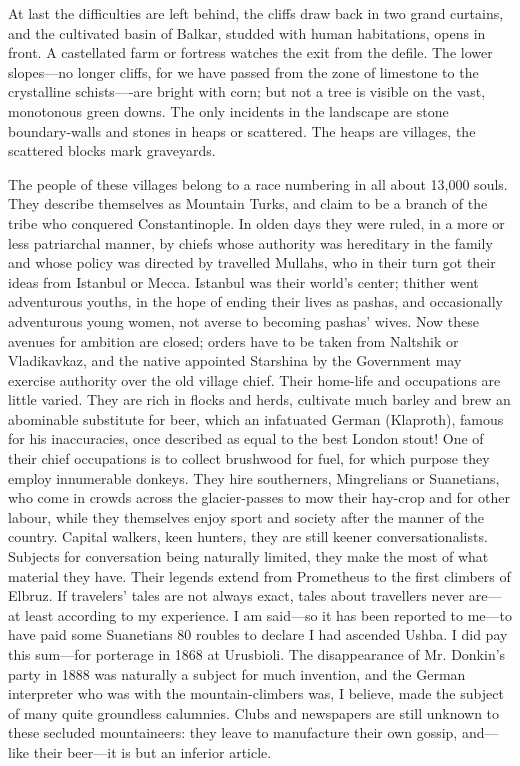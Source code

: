 \documentclass[25pt, a4paper]{article}
\begin{document}
	At last the difficulties are left behind, the cliffs draw back in two grand curtains, and the cultivated basin of Balkar, studded with human habitations, opens in front. A castellated farm or fortress watches the exit from the defile. The lower slopes—no longer cliffs, for we have passed from the zone of limestone to the crystalline schists—-are bright with corn; but not a tree is visible on the vast, monotonous green downs. The only incidents in the landscape are stone boundary-walls and stones in heaps or scattered. The heaps are villages, the scattered blocks mark graveyards.
	
	The people of these villages belong to a race numbering in all about 13,000 souls. They describe themselves as Mountain Turks, and claim to be a branch of the tribe who conquered Constantinople. In olden days they were ruled, in a more or less patriarchal manner, by chiefs whose authority was hereditary in the family and whose policy was directed by travelled Mullahs, who in their turn got their ideas from Istanbul or Mecca. Istanbul was their world's center; thither went adventurous youths, in the hope of ending their lives as pashas, and occasionally adventurous young women, not averse to becoming pashas' wives. Now these avenues for ambition are closed; orders have to be taken from Naltshik or Vladikavkaz, and the native appointed Starshina by the Government may exercise authority over the old village chief. Their home-life and occupations are little varied. They are rich in flocks and herds, cultivate much barley and brew an abominable substitute for beer, which an infatuated German (Klaproth), famous for his inaccuracies, once described as equal to the best London stout! One of their chief occupations is to collect brushwood for fuel, for which purpose they employ innumerable donkeys. They hire southerners, Mingrelians or Suanetians, who come in crowds across the glacier-passes to mow their hay-crop and for other labour, while they themselves enjoy sport and society after the manner of the country. Capital walkers, keen hunters, they are still keener conversationalists. Subjects for conversation being naturally limited, they make the most of what material they have. Their legends extend from Prometheus to the first climbers of Elbruz. If travelers’ tales are not always exact, tales about travellers never are—at least according to my experience. I am said—so it has been reported to me—to have paid some Suanetians 80 roubles to declare I had ascended Ushba. I did pay this sum—for porterage in 1868 at Urusbioli. The disappearance of Mr. Donkin's party in 1888 was naturally a subject for much invention, and the German interpreter who was with the mountain-climbers was, I believe, made the subject of many quite groundless calumnies. Clubs and newspapers are still unknown to these secluded mountaineers: they leave to manufacture their own gossip, and—like their beer—it is but an inferior article. 
	
\end{document}

